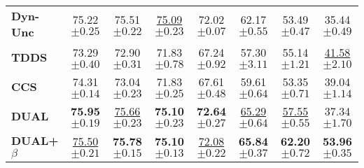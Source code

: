 \begin{table}[ht]
\begin{tabular}{lccccccc}
    \textbf{Dyn-Unc} & 75.22 \scriptsize{$\pm 0.25$} & 75.51 \scriptsize{$\pm 0.22$} & \underline{75.09} \scriptsize{$\pm 0.23$} & 72.02 \scriptsize{$\pm 0.07$} & 62.17 \scriptsize{$\pm 0.55$} & 53.49 \scriptsize{$\pm 0.47$} & 35.44 \scriptsize{$\pm 0.49$} \\
    
    \textbf{TDDS} & 73.29 \scriptsize{$\pm 0.40 $} & 72.90 \scriptsize{$\pm 0.31 $} & 71.83 \scriptsize{$\pm 0.78 $} & 67.24 \scriptsize{$\pm 0.92 $} & 57.30 \scriptsize{$\pm 3.11 $} & 55.14 \scriptsize{$\pm 1.21 $} & \underline{41.58} \scriptsize{$\pm 2.10 $} \\
    
    \textbf{CCS} & 74.31 \scriptsize{$\pm 0.14 $} & 73.04 \scriptsize{$\pm 0.23 $} & 71.83 \scriptsize{$\pm 0.25 $} & 67.61 \scriptsize{$\pm 0.48$} & 59.61 \scriptsize{$\pm 0.64$} & 53.35 \scriptsize{$\pm 0.71 $} & 39.04 \scriptsize{$\pm 1.14$} \\
    
    \midrule
    
    \textbf{DUAL} & \textbf{75.95} \scriptsize{$\pm 0.19$} & \underline{75.66} \scriptsize{$\pm 0.23$} & \textbf{75.10} \scriptsize{$\pm 0.23$} & \textbf{72.64} \scriptsize{$\pm 0.27$} & \underline{65.29} \scriptsize{$\pm 0.64$} & \underline{57.55} \scriptsize{$\pm 0.55$} & 37.34 \scriptsize{$\pm 1.70$} \\
    
    \textbf{DUAL+$\beta$} & \underline{75.50} \scriptsize{$\pm 0.21$} & \textbf{75.78} \scriptsize{$\pm 0.15 $} & \textbf{75.10} \scriptsize{$\pm 0.13 $} & \underline{72.08} \scriptsize{$\pm 0.22 $} & \textbf{65.84} \scriptsize{$\pm 0.37 $} & \textbf{62.20} \scriptsize{$\pm 0.72 $} & \textbf{53.96} \scriptsize{$\pm 0.35 $} \\
    
    \bottomrule
\end{tabular}
\end{table}



